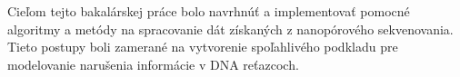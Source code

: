 Cieľom tejto bakalárskej práce bolo navrhnúť a implementovať pomocné algoritmy a metódy
na spracovanie dát získaných z nanopórového sekvenovania. Tieto postupy boli zamerané
na vytvorenie spoľahlivého podkladu pre modelovanie narušenia informácie v DNA reťazcoch.
